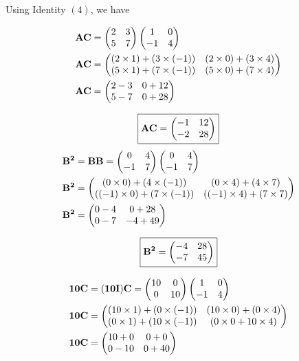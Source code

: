 \documentclass[journal,12pt,twocolumn]{IEEEtran}
\begin{document}
    Using Identity $(4)$, we have

    
      \begin{align}
      \mathbf{AC}&=
     \begin{pmatrix} 
        2 & 3 \\
        5 & 7
      \end{pmatrix} 
     \begin{pmatrix} 
        1 & 0 \\
        -1 & 4
      \end{pmatrix} \\
      \mathbf{AC}&=
     \begin{pmatrix} 
        (2\times1)+(3\times(-1)) & (2\times0)+(3\times4) \\
        (5\times1)+(7\times(-1)) & (5\times0)+(7\times4)
      \end{pmatrix} 
      \\
      \mathbf{AC}&=
     \begin{pmatrix} 
        2-3 & 0+12 \\
        5-7 & 0+28
      \end{pmatrix} 
      \end{align}

      \begin{equation}
        \boxed{\mathbf{AC}=
       \begin{pmatrix} 
          -1 & 12 \\
          -2 & 28 
        \end{pmatrix} 
        }
      \end{equation}  
    \begin{align}
      \mathbf{B^2}&=\mathbf{BB}
      =
     \begin{pmatrix} 
        0 & 4 \\
        -1 & 7
      \end{pmatrix} 
     \begin{pmatrix} 
        0 & 4 \\
        -1 & 7
      \end{pmatrix} 
    \\
      \mathbf{B^2}&=
     \begin{pmatrix} 
        (0\times0)+(4\times(-1)) & (0\times4)+(4\times7) \\
        ((-1)\times0)+(7\times(-1)) & ((-1)\times4)+(7\times7)
      \end{pmatrix} 
      \\ 
       \mathbf{B^2}&=
     \begin{pmatrix} 
        0-4 & 0+28 \\
        0-7 & -4+49
      \end{pmatrix} 
    \end{align}

      \begin{equation}
      \boxed{\mathbf{B^2}=
     \begin{pmatrix} 
        -4 & 28 \\
        -7 & 45 
      \end{pmatrix} 
      }
    \end{equation}
    
      \begin{align}
      \mathbf{10C}&=\mathbf{(10I)C} =
     \begin{pmatrix} 
        10 & 0 \\
        0 & 10
      \end{pmatrix} 
     \begin{pmatrix} 
        1 & 0 \\
        -1 & 4
      \end{pmatrix} 
        \\
      \mathbf{10C}&=
     \begin{pmatrix} 
        (10\times1)+(0\times(-1)) & (10\times0)+(0\times4) \\
        (0\times1)+(10\times(-1)) & (0\times0+10\times4)
      \end{pmatrix} 
        \\
      \mathbf{10C}&=
     \begin{pmatrix} 
        10+0 & 0+0 \\
        0-10 & 0+40
      \end{pmatrix} 
      \end{align}
\end{document}
